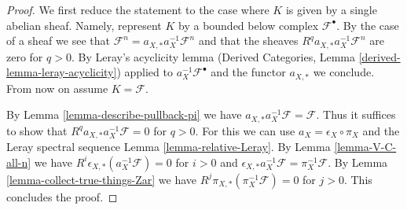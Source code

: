 \documentclass[10pt,a4paper]{amsart}
\theoremstyle{plain}
\theoremstyle{definition}
\theoremstyle{remark}
\numberwithin{equation}{subsection}
\begin{document}
\begin{proof}
We first reduce the statement to the case where
$K$ is given by a single abelian sheaf. Namely, represent $K$
by a bounded below complex $\mathcal{F}^\bullet$. By the case of a
sheaf we see that
$\mathcal{F}^n = a_{X, *} a_X^{-1} \mathcal{F}^n$
and that the sheaves $R^qa_{X, *}a_X^{-1}\mathcal{F}^n$
are zero for $q > 0$. By Leray's acyclicity lemma
(Derived Categories, Lemma \ref{derived-lemma-leray-acyclicity})
applied to $a_X^{-1}\mathcal{F}^\bullet$
and the functor $a_{X, *}$ we conclude. From now on assume $K = \mathcal{F}$.

\medskip\noindent
By Lemma \ref{lemma-describe-pullback-pi} we have
$a_{X, *}a_X^{-1}\mathcal{F} = \mathcal{F}$. Thus it suffices to show that
$R^qa_{X, *}a_X^{-1}\mathcal{F} = 0$ for $q > 0$.
For this we can use $a_X = \epsilon_X \circ \pi_X$ and
the Leray spectral sequence Lemma \ref{lemma-relative-Leray}.
By Lemma \ref{lemma-V-C-all-n}
we have $R^i\epsilon_{X, *}(a_X^{-1}\mathcal{F}) = 0$ for $i > 0$
and $\epsilon_{X, *}a_X^{-1}\mathcal{F} = \pi_X^{-1}\mathcal{F}$.
By Lemma \ref{lemma-collect-true-things-Zar} we have
$R^j\pi_{X, *}(\pi_X^{-1}\mathcal{F}) = 0$ for $j > 0$.
This concludes the proof.
\end{proof}
\end{document}
